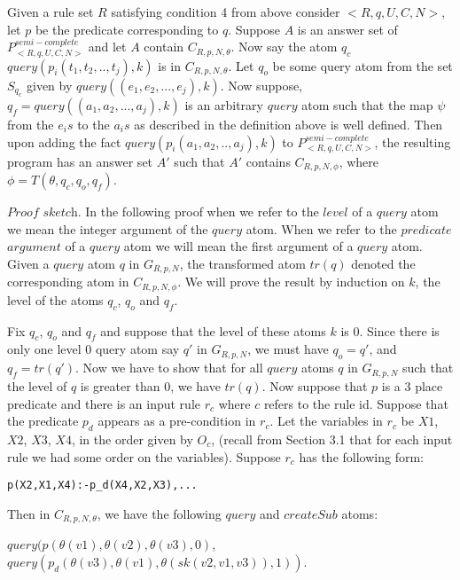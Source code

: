 \documentclass{article}
\begin{document}
\begin{theorem}\label{termsub}
Given a rule set $R$ satisfying condition 4 from above consider $<R,q,U,C,N>$, let $p$ be the predicate corresponding to $q$. Suppose $A$ is an answer set of $P^{semi-complete}_{<R,q,U,C,N>}$ and let $A$ contain $C_{R,p,N,\theta}$. Now say the atom $q_{c}$ $query(p_{i}(t_{1},t_{2},..,t_{j}),k)$ is in $C_{R,p,N,\theta}$. Let $q_{o}$ be some query atom from the set $S_{q_{c}}$ given by $query((e_{1},e_{2},...,e_{j}),k)$. Now suppose, $q_{f}= query((a_{1},a_{2},...,a_{j}),k)$ is an arbitrary $query$ atom such that the map $\psi$ from the $e_{i}s$ to the $a_{i}s$ as described in the definition above is well defined. Then upon adding the fact $query(p_{i}(a_{1},a_{2},..,a_{j}),k)$ to $P^{semi-complete}_{<R,q,U,C,N>}$, the resulting program has an answer set $A'$ such that $A'$ contains $C_{R,p,N,\phi}$, where $\phi = T(\theta, q_{c}, q_{o}, q_{f})$. 
\end{theorem}
$\textit{Proof sketch}$. In the following proof when we refer to the $level$ of a $query$ atom we mean the integer argument of the $query$ atom. When we refer to the $predicate$ $argument$ of a $query$ atom we will mean the first argument of a $query$ atom. Given a $query$ atom $q$ in $G_{R,p,N}$, the transformed atom $tr(q)$ denoted the corresponding atom in $C_{R,p,N,\phi}$. We will prove the result by induction on $k$, the level of the atoms $q_{c}$, $q_{o}$ and $q_{f}$. 

Fix $q_{c}$, $q_{o}$ and $q_{f}$ and suppose that the level of these atoms $k$ is $0$. Since there is only one level $0$ query atom say $q'$ in $G_{R,p,N}$, we must have $q_{o}=q'$, and $q_{f} = tr(q')$. Now we have to show that for all $query$ atoms $q$ in $G_{R,p,N}$ such that the level of $q$ is greater than $0$, we have $tr(q)$. Now suppose that $p$ is a 3 place predicate and there is an input rule $r_{c}$ where ${c}$ refers to the rule id. Suppose that the predicate $p_{d}$ appears as a pre-condition in $r_{c}$. Let the variables in $r_{c}$ be $X1$, $X2$, $X3$, $X4$, in the order given by $O_{c}$, (recall from Section 3.1 that for each input rule we had some order on the variables). Suppose $r_{c}$ has the following form:
\begin{verbatim}
p(X2,X1,X4):-p_d(X4,X2,X3),...    
\end{verbatim}
Then in $C_{R,p,N,\theta}$, we have the following $query$ and $createSub$ atoms:

$query(p(\theta(v1),\theta(v2),\theta(v3),0)$, $query(p_{d}(\theta(v3),\theta(v1),\theta(sk(v2,v1,v3)),1))$. 
\end{document}
